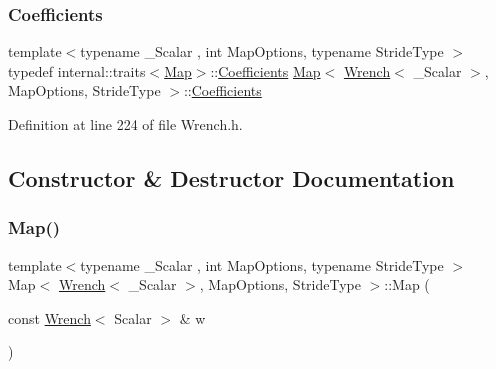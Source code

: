 \subsubsection{\texorpdfstring{Coefficients}{Coefficients}}
{\footnotesize\ttfamily template$<$typename \+\_\+\+Scalar , int Map\+Options, typename Stride\+Type $>$ \\
typedef internal\+::traits$<$\hyperlink{class_map_3_01_wrench_3_01___scalar_01_4_00_01_map_options_00_01_stride_type_01_4_ab778c7158f5d29d76672346ecfe4e3ea}{Map}$>$\+::\hyperlink{class_map_3_01_wrench_3_01___scalar_01_4_00_01_map_options_00_01_stride_type_01_4_abfc1bf3f7dc1d3051325edad634172e8}{Coefficients} \hyperlink{class_map_3_01_wrench_3_01___scalar_01_4_00_01_map_options_00_01_stride_type_01_4_ab778c7158f5d29d76672346ecfe4e3ea}{Map}$<$ \hyperlink{class_wrench}{Wrench}$<$ \+\_\+\+Scalar $>$, Map\+Options, Stride\+Type $>$\+::\hyperlink{class_map_3_01_wrench_3_01___scalar_01_4_00_01_map_options_00_01_stride_type_01_4_abfc1bf3f7dc1d3051325edad634172e8}{Coefficients}}



Definition at line 224 of file Wrench.\+h.



\subsection{Constructor \& Destructor Documentation}
\hypertarget{class_map_3_01_wrench_3_01___scalar_01_4_00_01_map_options_00_01_stride_type_01_4_ab778c7158f5d29d76672346ecfe4e3ea}{}\label{class_map_3_01_wrench_3_01___scalar_01_4_00_01_map_options_00_01_stride_type_01_4_ab778c7158f5d29d76672346ecfe4e3ea} 
\subsubsection{\texorpdfstring{Map()}{Map()}\hspace{0.1cm}{\footnotesize\ttfamily [1/4]}}
{\footnotesize\ttfamily template$<$typename \+\_\+\+Scalar , int Map\+Options, typename Stride\+Type $>$ \\
Map$<$ \hyperlink{class_wrench}{Wrench}$<$ \+\_\+\+Scalar $>$, Map\+Options, Stride\+Type $>$\+::Map (\begin{DoxyParamCaption}\item[{const \hyperlink{class_wrench}{Wrench}$<$ Scalar $>$ \&}]{w }\end{DoxyParamCaption})\hspace{0.3cm}{\ttfamily [inline]}}




